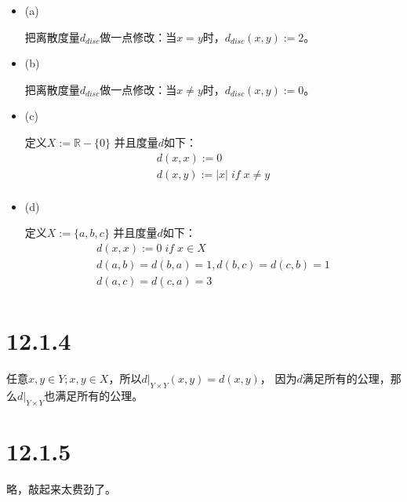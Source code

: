 \documentclass{article}
\begin{document}
\begin{itemize}
      \item (a)

            把离散度量$d_{disc}$做一点修改：当$x = y$时，$d_{disc}(x, y) := 2$。

      \item (b)

            把离散度量$d_{disc}$做一点修改：当$x \neq y$时，$d_{disc}(x, y) := 0$。

      \item (c)

            定义$X := \mathbb{R} - \{0\}$ 并且度量$d$如下：
            \begin{align*}
                  d(x, x) := 0                     \\
                  d(x, y) := |x| \; if \; x \neq y \\
            \end{align*}

      \item (d)

            定义$X := \{a, b, c\}$ 并且度量$d$如下：
            \begin{align*}
                  d(x, x) := 0 \; if \; x \in X               \\
                  d(a, b) = d(b, a) = 1, d(b,c) = d(c, b) = 1 \\
                  d(a, c) = d(c, a) = 3                       \\
            \end{align*}

\end{itemize}

\section*{12.1.4}

任意$x, y \in Y; x, y \in X$，所以$d|_{Y \times Y}(x, y) = d(x, y)$，
因为$d$满足所有的公理，那么$d|_{Y \times Y}$也满足所有的公理。

\section*{12.1.5}

略，敲起来太费劲了。

\end{document}
